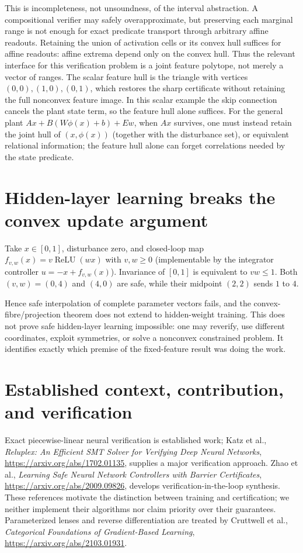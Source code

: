 \documentclass[11pt]{article}
\begin{document}
This is incompleteness, not unsoundness, of the interval abstraction. A compositional verifier may safely overapproximate, but preserving each marginal range is not enough for exact predicate transport through arbitrary affine readouts. Retaining the union of activation cells or its convex hull suffices for affine readouts: affine extrema depend only on the convex hull. Thus the relevant interface for this verification problem is a joint feature polytope, not merely a vector of ranges. The scalar feature hull is the triangle with vertices $(0,0),(1,0),(0,1)$, which restores the sharp certificate without retaining the full nonconvex feature image. In this scalar example the skip connection cancels the plant state term, so the feature hull alone suffices. For the general plant $Ax+B(W\phi(x)+b)+Ew$, when $Ax$ survives, one must instead retain the joint hull of $(x,\phi(x))$ (together with the disturbance set), or equivalent relational information; the feature hull alone can forget correlations needed by the state predicate.

\section{Hidden-layer learning breaks the convex update argument}
Take $x\in[0,1]$, disturbance zero, and closed-loop map
$f_{v,w}(x)=v\operatorname{ReLU}(wx)$ with $v,w\ge0$ (implementable by the integrator controller $u=-x+f_{v,w}(x)$). Invariance of $[0,1]$ is equivalent to $vw\le1$. Both $(v,w)=(0,4)$ and $(4,0)$ are safe, while their midpoint $(2,2)$ sends $1$ to $4$.

Hence safe interpolation of complete parameter vectors fails, and the convex-fibre/projection theorem does not extend to hidden-weight training. This does not prove safe hidden-layer learning impossible: one may reverify, use different coordinates, exploit symmetries, or solve a nonconvex constrained problem. It identifies exactly which premise of the fixed-feature result was doing the work.

\section{Established context, contribution, and verification}
Exact piecewise-linear neural verification is established work; Katz et al., \emph{Reluplex: An Efficient SMT Solver for Verifying Deep Neural Networks}, \url{https://arxiv.org/abs/1702.01135}, supplies a major verification approach. Zhao et al., \emph{Learning Safe Neural Network Controllers with Barrier Certificates}, \url{https://arxiv.org/abs/2009.09826}, develops verification-in-the-loop synthesis. These references motivate the distinction between training and certification; we neither implement their algorithms nor claim priority over their guarantees. Parameterized lenses and reverse differentiation are treated by Cruttwell et al., \emph{Categorical Foundations of Gradient-Based Learning}, \url{https://arxiv.org/abs/2103.01931}.
\end{document}
